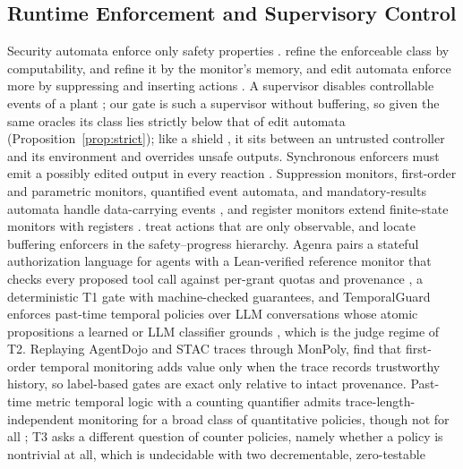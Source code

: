 \subsection{Runtime Enforcement and Supervisory Control}
Security automata enforce only safety properties
\citep{schneider2000enforceable}. \citet{hamlen2006computability} refine the
enforceable class by computability, \citet{fong2004shallow} and
\citet{talhi2008memory} refine it by the monitor's memory, and edit automata enforce more by
suppressing and inserting actions \citep{ligatti2005edit}. A supervisor
disables controllable events of a plant \citep{ramadge1987supervisory}; our
gate is such a supervisor without buffering, so given the same oracles
its class lies strictly below that of edit automata
(Proposition~\ref{prop:strict}); like a shield \citep{bloem2015shield}, it sits between an
untrusted controller and its environment and overrides unsafe outputs. Synchronous enforcers must
emit a possibly edited output in every reaction \citep{pinisetty2017synchronous,anand2025prompt}.
Suppression monitors, first-order and parametric monitors, quantified event automata, and
mandatory-results automata handle data-carrying events
\citep{aceto2023firstorder,hublet2024proactive,rosu2012parametric,basin2015monpoly,barringer2012qea,ligatti2010mra},
and register monitors extend finite-state monitors with registers
\citep{grigore2013register,ferrere2018register}. \citet{basin2013enforceable} treat actions that
are only observable, and \citet{falcone2012verify} locate buffering enforcers in the
safety--progress hierarchy. Agenra pairs a stateful authorization language for agents with a
Lean-verified reference monitor that checks every proposed tool call against per-grant quotas
and provenance \citep{shivakumar2026agenra}, a deterministic T1 gate with machine-checked
guarantees, and TemporalGuard enforces past-time temporal policies over LLM conversations whose
atomic propositions a learned or LLM classifier grounds \citep{cohen2026temporal}, which is the
judge regime of T2. Replaying AgentDojo and STAC traces through MonPoly, \citet{kekatos2026formal} find that
first-order temporal monitoring adds value only when the trace records trustworthy history,
so label-based gates are exact only relative to intact provenance.
Past-time metric temporal logic with a counting quantifier admits trace-length-independent
monitoring for a broad class of quantitative policies, though not for all
\citep{du2021tracelength}; T3 asks a different question of counter policies, namely whether a
policy is nontrivial at all, which is undecidable with two decrementable, zero-testable
